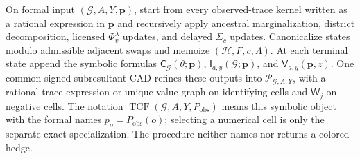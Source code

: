 On formal input \((\mathcal G,A,Y,\mathbf p)\), start from every observed-trace kernel written as a rational expression in \(\mathbf p\) and recursively apply ancestral marginalization, district decomposition, licensed \(\Phi_v^{\lambda}\) updates, and delayed \(\Sigma_c\) updates. Canonicalize states modulo admissible adjacent swaps and memoize \((\mathcal H,F,c,\Lambda)\). At each terminal state append the symbolic formulas \(\mathsf C_{\mathcal G}(\theta;\mathbf p)\), \(\mathsf I_{a,y}(\mathcal G;\mathbf p)\), and \(\mathsf V_{a,y}(\mathbf p,z)\). One common signed-subresultant CAD refines these outputs into \(\mathscr P_{\mathcal G,A,Y}\), with a rational trace expression or unique-value graph on identifying cells and \(\mathsf W_j\) on negative cells. The notation \(\operatorname{TCF}(\mathcal G,A,Y,P_{\mathrm{obs}})\) means this symbolic object with the formal names \(p_o=P_{\mathrm{obs}}(o)\); selecting a numerical cell is only the separate exact specialization. The procedure neither names nor returns a colored hedge.